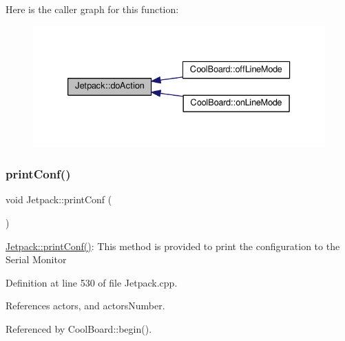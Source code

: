 Here is the caller graph for this function\+:\nopagebreak
\begin{figure}[H]
\begin{center}
\leavevmode
\includegraphics[width=333pt]{classJetpack_a86d2e83436ef4b85f4c3a6e85ac785b0_icgraph}
\end{center}
\end{figure}
\mbox{\label{classJetpack_ac54a7bb4f9166bee32052253d9b1d306}} 
\subsubsection{\texorpdfstring{print\+Conf()}{printConf()}}
{\footnotesize\ttfamily void Jetpack\+::print\+Conf (\begin{DoxyParamCaption}{ }\end{DoxyParamCaption})}

\hyperlink{classJetpack_ac54a7bb4f9166bee32052253d9b1d306}{Jetpack\+::print\+Conf()}\+: This method is provided to print the configuration to the Serial Monitor 

Definition at line 530 of file Jetpack.\+cpp.



References actors, and actors\+Number.



Referenced by Cool\+Board\+::begin().


